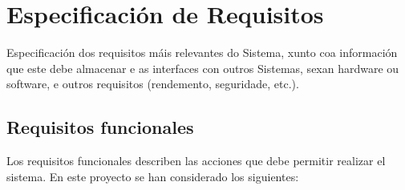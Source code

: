 \chapter{Especificación de Requisitos}

Especificación dos requisitos máis relevantes do Sistema, xunto coa información que este debe almacenar e as interfaces con outros Sistemas, sexan hardware ou software, e outros requisitos (rendemento, seguridade, etc.).

\section{Requisitos funcionales}

Los requisitos funcionales describen las acciones que debe permitir realizar el sistema. En este proyecto se han considerado los siguientes:

